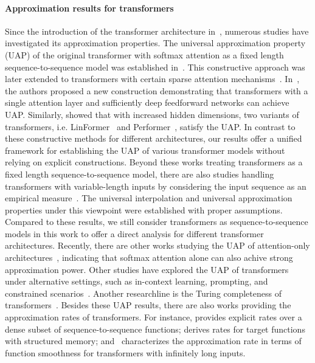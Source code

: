 \documentclass{article}
\begin{document}
\paragraph{Approximation results for transformers}
Since the introduction of the transformer architecture in~\cite{vaswani2017attention}, numerous studies have investigated its approximation properties. The universal approximation property (UAP) of the original transformer with softmax attention as a fixed length sequence-to-sequence model was established in~\cite{yun2019transformers}. This constructive approach was later extended to transformers with certain sparse attention mechanisms~\cite{yun2020n, zaheer2020big}. In~\cite{kajitsukatransformers}, the authors proposed a new construction demonstrating that transformers with a single attention layer and sufficiently deep feedforward networks can achieve UAP. Similarly,\cite{alberti2023sumformer} showed that with increased hidden dimensions, two variants of transformers, i.e. LinFormer~\cite{wang2020linformer} and Performer~\cite{choromanski2020rethinking}, satisfy the UAP.
In contrast to these constructive methods for different architectures, our results offer a unified framework for establishing the UAP of various transformer models without relying on explicit constructions. 
Beyond these works treating transformers as a fixed length sequence-to-sequence model, there are also studies handling transformers with variable-length inputs by considering the input sequence as an empirical measure~\cite{furuya2024transformers,geshkovski2024measure,geshkovski2025mathematical}. The universal interpolation and universal approximation properties under this viewpoint were established with proper assumptions. Compared to these results, we still consider transformers as sequence-to-sequence models in this work to offer a direct analysis for different transformer architectures. Recently, there are other works studying the UAP of attention-only architectures~\cite{liu2025attention, hu2025universal}, indicating that softmax attention alone can also achive strong approximation power.
Other studies have explored the UAP of transformers under alternative settings, such as in-context learning, prompting, and constrained scenarios~\cite{kratsios2021universal, luo2022your, furuya2024transformers, petrov2024prompting,hu2025fundamental}. Another researchline is the Turing completeness of transformers~\cite{perez2021attention, wei2022statistically}.
Besides these UAP results, there are also works providing the approximation rates of transformers. For instance,\cite{jiang2024approximation} provides explicit rates over a dense subset of sequence-to-sequence functions; \cite{wang2024understanding} derives rates for target functions with structured memory; and~\cite{takakura2023approximation} characterizes the approximation rate in terms of function smoothness for transformers with infinitely long inputs.
\end{document}
